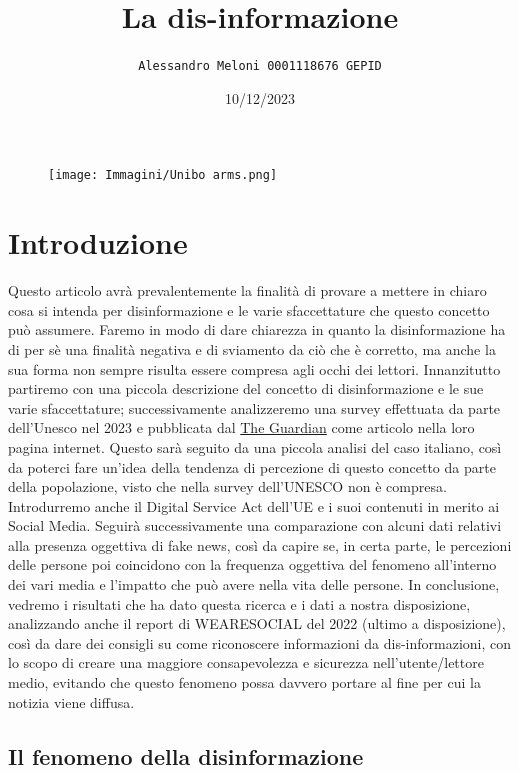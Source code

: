 \documentclass{article}
\title{\Huge\textbf{La dis-informazione}}
\author{\texttt{Alessandro Meloni 0001118676 GEPID}}
\date{10/12/2023}
\begin{document}
\begin{figure}
    \centering
    \texttt{[image: Immagini/Unibo arms.png]}
\end{figure}
    \maketitle
\centering\tableofcontents
\newpage \section{Introduzione}
\flushleft
\begin{justify}
    Questo articolo avrà prevalentemente la finalità di provare a mettere in chiaro cosa si intenda per disinformazione e le varie sfaccettature che questo concetto può assumere.
    Faremo in modo di dare chiarezza in quanto la disinformazione ha di per sè una finalità negativa e di sviamento da ciò che è corretto, ma anche la sua forma non sempre risulta essere compresa agli occhi dei lettori.
    Innanzitutto partiremo con una piccola descrizione del concetto di disinformazione e le sue varie sfaccettature; successivamente analizzeremo una survey effettuata da parte dell'Unesco nel 2023 e pubblicata dal \href{https://www.theguardian.com/technology/2023/nov/07/85-of-people-worry-about-online-disinformation-global-survey-finds}{The Guardian}\label{:articolo} come articolo nella loro pagina internet. Questo sarà seguito da una piccola analisi del caso italiano, così da poterci fare un'idea della tendenza di percezione di questo concetto da parte della popolazione, visto che nella survey dell'UNESCO non è compresa.
    Introdurremo anche il Digital Service Act dell'UE e i suoi contenuti in merito ai Social Media.
    Seguirà successivamente una comparazione con alcuni dati relativi alla presenza oggettiva di fake news, così da capire se, in certa parte, le percezioni delle persone poi coincidono con la frequenza oggettiva del fenomeno all'interno dei vari media e l'impatto che può avere nella vita delle persone.
    In conclusione, vedremo i risultati che ha dato questa ricerca e i dati a nostra disposizione, analizzando anche il report di WEARESOCIAL del 2022 (ultimo a disposizione), così da dare dei consigli su come riconoscere informazioni da dis-informazioni, con lo scopo di creare una maggiore consapevolezza e sicurezza nell'utente/lettore medio, evitando che questo fenomeno possa davvero portare al fine per cui la notizia viene diffusa.
\end{justify}

\begin{center}
\section{Il fenomeno della disinformazione}
\end{center}
\end{document}
